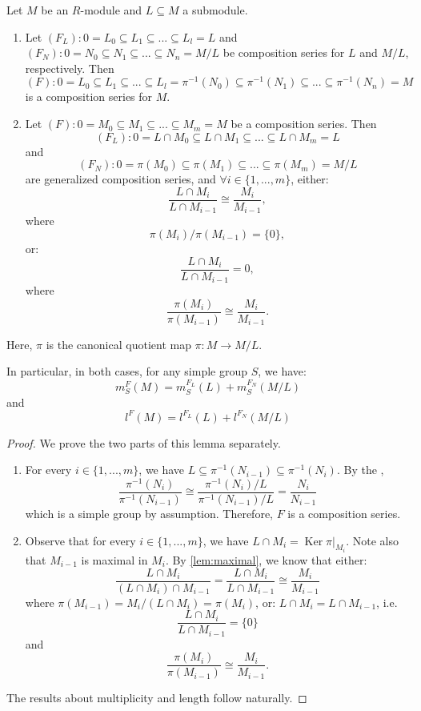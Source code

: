 \documentclass[12pt, a4paper, titlepage]{report}
\DeclareMathOperator{\Ker}{Ker}
\begin{document}
\begin{lem}
  Let $M$ be an $R$-module and $L \subseteq M$ a submodule.

  \begin{enumerate}[(1)]
  \item Let $(F_L) : 0 = L_0 \subseteq L_1 \subseteq ... \subseteq L_l = L$ and $(F_N) : 0 = N_0 \subseteq N_1 \subseteq ... \subseteq N_n = M/L$
    be composition series for $L$ and $M/L$, respectively. Then
    \[
      (F) : 0 = L_0 \subseteq L_1 \subseteq ... \subseteq L_l = \pi^{-1}(N_0) \subseteq \pi^{-1}(N_1) \subseteq ... \subseteq \pi^{-1}(N_n) = M
    \]
    is a composition series for $M$.
  \item Let $(F) : 0 = M_0 \subseteq M_1 \subseteq ... \subseteq M_m = M$ be a composition series. Then
    \[
      (F_L) : 0 = L \cap M_0 \subseteq L \cap M_1 \subseteq ... \subseteq L \cap M_m = L
    \]
    and
    \[
      (F_N) : 0 = \pi(M_0) \subseteq \pi(M_1) \subseteq ... \subseteq \pi(M_m) = M/L
    \]
    are generalized composition series, and $\forall i \in \{1, ..., m\}$, either:
    \[
      \frac{L \cap M_i}{L \cap M_{i-1}} \cong \frac{M_i}{M_{i-1}},
    \]where
    \[
      \pi(M_i) \big/ \pi(M_{i-1}) = \{ 0 \},
    \]
    or:
    \[
      \frac{L \cap M_i}{L \cap M_{i-1}} = 0,
    \]
    where
    \[
      \frac{\pi(M_i)}{\pi(M_{i-1})} \cong \frac{M_i}{M_{i-1}}.
    \]
  \end{enumerate}
  Here, $\pi$ is the canonical quotient map $\pi : M \to M/L$.

  In particular, in both cases, for any simple group $S$, we have:
  \[
    m^F_S(M) = m^{F_{L}}_{S}(L) + m^{F_N}_{S}(M/L)
  \]
  and
  \[
    l^F(M) = l^{F_L}(L) + l^{F_N}(M/L)
  \]
\end{lem}

\begin{proof}
  We prove the two parts of this lemma separately.
  \begin{enumerate}[(1)]
  \item
    For every $i \in \{1, ..., m\}$, we have $L \subseteq \pi^{-1}(N_{i-1}) \subseteq \pi^{-1}(N_i)$. By the
    ,
    \[
      \frac{\pi^{-1}(N_i)}{\pi^{-1}(N_{i-1})} \cong \frac{\pi^{-1}(N_i)/L}{\pi^{-1}(N_{i-1})/L} = \frac{N_i}{N_{i-1}}
    \]
    which is a simple group by assumption. Therefore, $F$ is a composition series.
  \item
    Observe that for every $i \in \{1, ..., m\}$, we have $L \cap M_i = \Ker \pi \vert_{M_i}$. Note also that
    $M_{i-1}$ is maximal in $M_i$. By \autoref{lem:maximal}, we know that either:
    \[
      \frac{L \cap M_i}{(L \cap M_i) \cap M_{i-1}} = \frac{L \cap M_i}{L \cap M_{i-1}} \cong \frac{M_i}{M_{i-1}}
    \]
    where $\pi(M_{i-1}) = M_i/(L \cap M_i) = \pi(M_i)$, or: $L \cap M_i = L \cap M_{i-1}$, i.e. 
    \[
      \frac{L \cap M_i}{L \cap M_{i-1}} = \{0\}
    \]
    and
    \[
      \frac{\pi(M_i)}{\pi(M_{i-1})} \cong \frac{M_i}{M_{i-1}}.
    \]
  \end{enumerate}

  The results about multiplicity and length follow naturally.
\end{proof}
\end{document}
